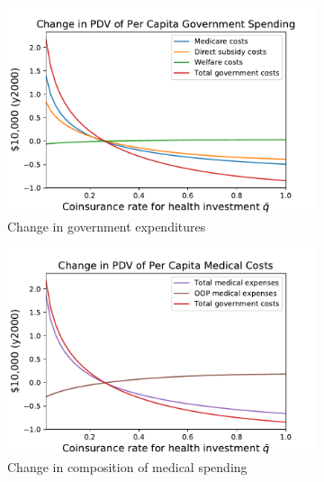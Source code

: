 \documentclass[12pt,pdftex,letterpaper]{article}
\begin{document}
\begin{figure}[h!]
    \centering
    \begin{subfigure}[b]{0.49\textwidth}
        \centering
        \includegraphics[width=\textwidth]{../Figures/FlatCopayInvstGovtChange.pdf}
        \caption{Change in government expenditures}
    \end{subfigure}
    \begin{subfigure}[b]{0.49\textwidth}
        \centering
        \includegraphics[width=\textwidth]{../Figures/FlatCopayInvstMedChange.pdf}
        \caption{Change in composition of medical spending}
    \end{subfigure}
    \begin{subfigure}[b]{0.49\textwidth}
        \centering

\end{subfigure}
\end{figure}
\end{document}
